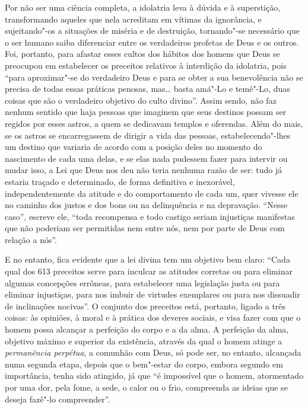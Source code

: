 Por não ser uma ciência completa, a idolatria leva à dúvida e à
superstição, transformando aqueles que nela acreditam em vítimas da
ignorância, e sujeitando"-os a situações de miséria e de destruição,
tornando"-se necessário que o ser humano saiba diferenciar entre os
verdadeiros profetas de Deus e os outros. Foi, portanto, para afastar
esses cultos dos hábitos dos homens que Deus se preocupou em estabelecer
os preceitos relativos à interdição da idolatria, pois ``para
aproximar"-se do verdadeiro Deus e para se obter a sua benevolência não
se precisa de todas essas práticas penosas, mas\ldots{} basta amá"-Lo e
temê"-Lo, duas coisas que são o verdadeiro objetivo do culto divino''.
Assim sendo, não faz nenhum sentido que haja pessoas que imaginem que
seus destinos possam ser regidos por esses astros, a quem se dedicavam
templos e oferendas. Além do mais, se os astros se encarregassem de
dirigir a vida das pessoas, estabelecendo"-lhes um destino que variaria
de acordo com a posição deles no momento do
nascimento de cada uma delas, e se elas nada pudessem fazer para
intervir ou mudar isso, a Lei que Deus nos deu não teria nenhuma razão
de ser: tudo já estaria traçado e determinado, de forma definitiva e
inexorável, independentemente da atitude e do comportamento de cada um,
quer vivesse ele no caminho dos justos e dos bons ou na delinquência e
na depravação. ``Nesse caso'', escreve ele, ``toda recompensa e todo
castigo seriam injustiças manifestas que não poderiam ser permitidas nem
entre nós, nem por parte de Deus com relação a nós''.

E no entanto, fica evidente que a lei divina tem um objetivo bem claro:
``Cada qual dos 613 preceitos serve para inculcar as atitudes corretas
ou para eliminar algumas concepções errôneas, para estabelecer uma
legislação justa ou para eliminar injustiças, para nos imbuir de
virtudes exemplares ou para nos dissuadir de inclinações nocivas''. O
conjunto dos preceitos está, portanto, ligado a três coisas: às
opiniões, à moral e à prática dos deveres sociais, e visa fazer com que
o homem possa alcançar a perfeição do corpo e a da alma. A perfeição da
alma, objetivo máximo e superior da existência, através da qual o homem
atinge a \emph{permanência perpétua}, a comunhão com Deus, só pode ser, no
entanto, alcançada numa segunda etapa, depois que o bem"-estar do corpo,
embora segundo em importância, tenha sido atingido, já que ``é
impossível que o homem, atormentado por uma dor, pela fome, a sede, o
calor ou o frio, compreenda as ideias que se deseja fazê"-lo
compreender''.

